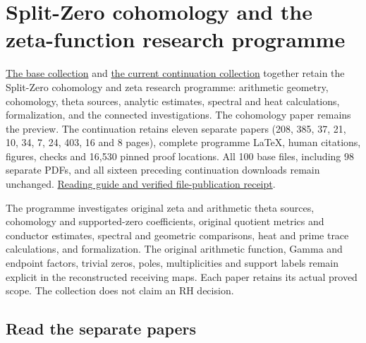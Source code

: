 \documentclass[
]{article}
\author{}
\date{}
\begin{document}
\section{Split-Zero cohomology and the zeta-function research
programme}\label{split-zero-cohomology-and-the-zeta-function-research-programme}

\href{https://zenodo.org/records/22911829}{The base collection} and
\href{https://zenodo.org/records/22920941}{the current continuation
collection} together retain the Split-Zero cohomology and zeta research
programme: arithmetic geometry, cohomology, theta sources, analytic
estimates, spectral and heat calculations, formalization, and the
connected investigations. The cohomology paper remains the preview. The
continuation retains eleven separate papers (208, 385, 37, 21, 10, 34,
7, 24, 403, 16 and 8 pages), complete programme LaTeX, human citations,
figures, checks and 16,530 pinned proof locations. All 100 base files,
including 98 separate PDFs, and all sixteen preceding continuation
downloads remain unchanged.
\href{https://github.com/KokunoYumeto/zeta-function-research-reader/blob/main/workbenches/splitzero-tandem/continuations/20260923-retained-source-publication/README.md}{Reading
guide and verified file-publication receipt}.

The programme investigates original zeta and arithmetic theta sources,
cohomology and supported-zero coefficients, original quotient metrics
and conductor estimates, spectral and geometric comparisons, heat and
prime trace calculations, and formalization. The original arithmetic
function, Gamma and endpoint factors, trivial zeros, poles,
multiplicities and support labels remain explicit in the reconstructed
receiving maps. Each paper retains its actual proved scope. The
collection does not claim an RH decision.

\subsection{Read the separate papers}\label{read-the-separate-papers}
\end{document}

